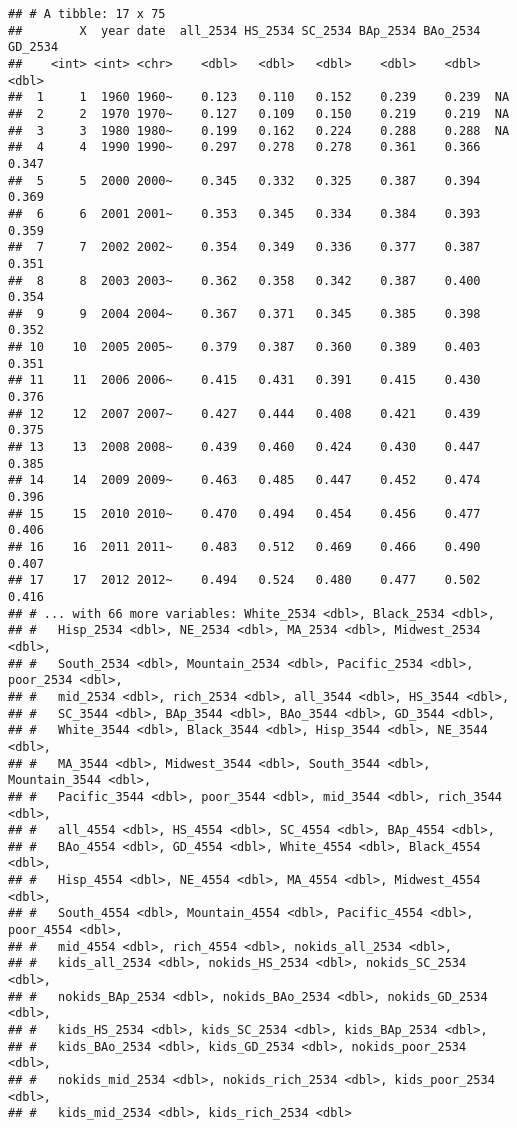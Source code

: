 \documentclass[
]{article}
\begin{document}
\begin{verbatim}
## # A tibble: 17 x 75
##        X  year date  all_2534 HS_2534 SC_2534 BAp_2534 BAo_2534 GD_2534
##    <int> <int> <chr>    <dbl>   <dbl>   <dbl>    <dbl>    <dbl>   <dbl>
##  1     1  1960 1960~    0.123   0.110   0.152    0.239    0.239  NA    
##  2     2  1970 1970~    0.127   0.109   0.150    0.219    0.219  NA    
##  3     3  1980 1980~    0.199   0.162   0.224    0.288    0.288  NA    
##  4     4  1990 1990~    0.297   0.278   0.278    0.361    0.366   0.347
##  5     5  2000 2000~    0.345   0.332   0.325    0.387    0.394   0.369
##  6     6  2001 2001~    0.353   0.345   0.334    0.384    0.393   0.359
##  7     7  2002 2002~    0.354   0.349   0.336    0.377    0.387   0.351
##  8     8  2003 2003~    0.362   0.358   0.342    0.387    0.400   0.354
##  9     9  2004 2004~    0.367   0.371   0.345    0.385    0.398   0.352
## 10    10  2005 2005~    0.379   0.387   0.360    0.389    0.403   0.351
## 11    11  2006 2006~    0.415   0.431   0.391    0.415    0.430   0.376
## 12    12  2007 2007~    0.427   0.444   0.408    0.421    0.439   0.375
## 13    13  2008 2008~    0.439   0.460   0.424    0.430    0.447   0.385
## 14    14  2009 2009~    0.463   0.485   0.447    0.452    0.474   0.396
## 15    15  2010 2010~    0.470   0.494   0.454    0.456    0.477   0.406
## 16    16  2011 2011~    0.483   0.512   0.469    0.466    0.490   0.407
## 17    17  2012 2012~    0.494   0.524   0.480    0.477    0.502   0.416
## # ... with 66 more variables: White_2534 <dbl>, Black_2534 <dbl>,
## #   Hisp_2534 <dbl>, NE_2534 <dbl>, MA_2534 <dbl>, Midwest_2534 <dbl>,
## #   South_2534 <dbl>, Mountain_2534 <dbl>, Pacific_2534 <dbl>, poor_2534 <dbl>,
## #   mid_2534 <dbl>, rich_2534 <dbl>, all_3544 <dbl>, HS_3544 <dbl>,
## #   SC_3544 <dbl>, BAp_3544 <dbl>, BAo_3544 <dbl>, GD_3544 <dbl>,
## #   White_3544 <dbl>, Black_3544 <dbl>, Hisp_3544 <dbl>, NE_3544 <dbl>,
## #   MA_3544 <dbl>, Midwest_3544 <dbl>, South_3544 <dbl>, Mountain_3544 <dbl>,
## #   Pacific_3544 <dbl>, poor_3544 <dbl>, mid_3544 <dbl>, rich_3544 <dbl>,
## #   all_4554 <dbl>, HS_4554 <dbl>, SC_4554 <dbl>, BAp_4554 <dbl>,
## #   BAo_4554 <dbl>, GD_4554 <dbl>, White_4554 <dbl>, Black_4554 <dbl>,
## #   Hisp_4554 <dbl>, NE_4554 <dbl>, MA_4554 <dbl>, Midwest_4554 <dbl>,
## #   South_4554 <dbl>, Mountain_4554 <dbl>, Pacific_4554 <dbl>, poor_4554 <dbl>,
## #   mid_4554 <dbl>, rich_4554 <dbl>, nokids_all_2534 <dbl>,
## #   kids_all_2534 <dbl>, nokids_HS_2534 <dbl>, nokids_SC_2534 <dbl>,
## #   nokids_BAp_2534 <dbl>, nokids_BAo_2534 <dbl>, nokids_GD_2534 <dbl>,
## #   kids_HS_2534 <dbl>, kids_SC_2534 <dbl>, kids_BAp_2534 <dbl>,
## #   kids_BAo_2534 <dbl>, kids_GD_2534 <dbl>, nokids_poor_2534 <dbl>,
## #   nokids_mid_2534 <dbl>, nokids_rich_2534 <dbl>, kids_poor_2534 <dbl>,
## #   kids_mid_2534 <dbl>, kids_rich_2534 <dbl>
\end{verbatim}
\end{document}
